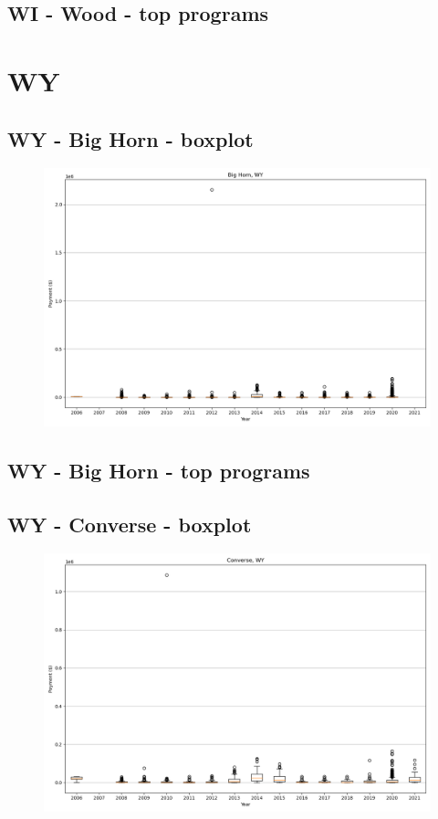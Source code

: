 \subsection*{WI - Wood - top programs}

\newpage
\section*{WY}
\subsection*{WY - Big Horn - boxplot}
\begin{figure}[h]
\centering
\includegraphics[width=7in]{../output/boxplots/counties/Big Horn-WY_boxplot.png}
\end{figure}


\subsection*{WY - Big Horn - top programs}

\newpage
\subsection*{WY - Converse - boxplot}
\begin{figure}[h]
\centering
\includegraphics[width=7in]{../output/boxplots/counties/Converse-WY_boxplot.png}
\end{figure}


